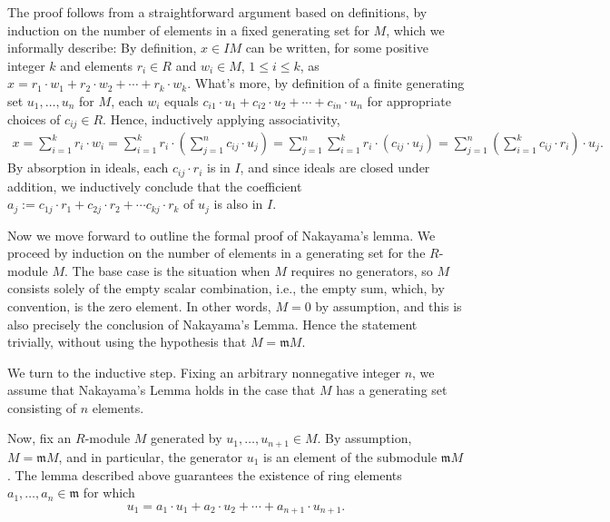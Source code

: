 \documentclass{article}
\begin{document}
The proof follows from a straightforward argument based on definitions, by
induction on the number of elements in a fixed generating set for $M$, which we
informally describe: By definition, $x \in I M$ can  be written, for some
positive integer $k$ and elements $r_i \in R$ and $w_i \in M$,
$1 \leq i \leq k$, as $x = r_1 \cdot w_1 + r_2 \cdot w_2 + \cdots +
r_k \cdot w_k$. What's more, by definition of a finite generating set $u_{1},
\dots, u_{n}$ for $M$, each $w_i$ equals $c_{i1} \cdot u_1 + c_{i2} \cdot u_2 +
\cdots + c_{in} \cdot u_n$ for appropriate choices of $c_{ij} \in R$. Hence,
inductively applying associativity, 
\begin{align*}
  x = \sum_{i=1}^{k} r_i \cdot w_i
    = \sum_{i=1}^{k} r_i \cdot \left(\sum_{j=1}^n c_{ij} \cdot  u_j\right)
    = \sum_{j=1}^{n}\sum_{i=1}^{k} r_i \cdot (c_{ij} \cdot u_j) 
    = \sum_{j=1}^{n}\left(\sum_{i=1}^{k} c_{ij} \cdot r_i\right) \cdot u_j.   
\end{align*}
By absorption in ideals, each  $c_{ij}  \cdot r_i$ is in $I$, and since ideals
are closed under addition, we inductively conclude that the coefficient $a_j
:= c_{1j} \cdot  r_1 +  c_{2j} \cdot  r_2 +  \cdots c_{kj}\cdot r_k$ of $u_j$
is also in $I$. 

Now we move forward to outline the formal proof of Nakayama's lemma. We proceed
by induction on the number of elements in a generating set for the $R$-module
$M$. The base case is the situation when \(M\) requires no generators, so $M$
consists solely of the empty scalar combination, i.e., the empty sum, which, by
convention, is the zero element. In other words, $M = 0$ by assumption, and
this is also precisely the conclusion of Nakayama's Lemma.  Hence the statement
trivially, without using the hypothesis that $M = \mathfrak{m} M$.

We turn to the inductive step.  Fixing an arbitrary nonnegative integer $n$, 
we assume that Nakayama's Lemma holds in the case that $M$ has a generating set 
consisting of $n$ elements. 

Now, fix an $R$-module $M$ generated by $u_1, \ldots, u_{n+1} \in M$. By
assumption, \(M = \mathfrak{m} M\), and in particular, the generator $u_1$ is
an element of the submodule $\mathfrak{m} M$. The lemma described above
guarantees the existence of ring elements $a_1, \ldots, a_n \in \mathfrak{m}$
for which 
\[u_{1} = a_{1} \cdot u_{1} + a_2 \cdot u_2 + \cdots + a_{n+1} \cdot u_{n+1}.\]
\end{document}
